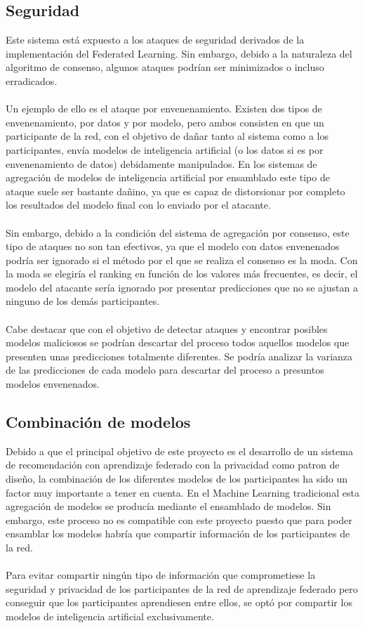 \subsection{Seguridad}
Este sistema está expuesto a los ataques de seguridad derivados de la implementación del Federated Learning. Sin embargo, debido a la naturaleza del algoritmo de consenso, algunos ataques podrían ser minimizados o incluso erradicados.
\\ \\
Un ejemplo de ello es el ataque por envenenamiento. Existen dos tipos de envenenamiento, por datos y por modelo, pero ambos consisten en que un participante de la red, con el objetivo de dañar tanto al sistema como a los participantes, envía modelos de inteligencia artificial (o los datos si es por envenenamiento de datos) debidamente manipulados. En los sistemas de agregación de modelos de inteligencia artificial por ensamblado este tipo de ataque suele ser bastante dañino, ya que es capaz de distorsionar por completo los resultados del modelo final con lo enviado por el atacante.
\\ \\
Sin embargo, debido a la condición del sistema de agregación por consenso, este tipo de ataques no son tan efectivos, ya que el modelo con datos envenenados podría ser ignorado si el método por el que se realiza el consenso es la moda. Con la moda se elegiría el ranking en función de los valores más frecuentes, es decir, el modelo del atacante sería ignorado por presentar predicciones que no se ajustan a ninguno de los demás participantes.
\\ \\
Cabe destacar que con el objetivo de detectar ataques y encontrar posibles modelos maliciosos se podrían descartar del proceso todos aquellos modelos que presenten unas predicciones totalmente diferentes. Se podría analizar la varianza de las predicciones de cada modelo para descartar del proceso a presuntos modelos envenenados.

\subsection{Combinación de modelos}
Debido a que el principal objetivo de este proyecto es el desarrollo de un sistema de recomendación con aprendizaje federado con la privacidad como patron de diseño, la combinación de los diferentes modelos de los participantes ha sido un factor muy importante a tener en cuenta. En el Machine Learning tradicional esta agregación de modelos se producía mediante el ensamblado de modelos. Sin embargo, este proceso no es compatible con este proyecto puesto que para poder ensamblar los modelos habría que compartir información de los participantes de la red.
\\ \\
Para evitar compartir ningún tipo de información que comprometiese la seguridad y privacidad de los participantes de la red de aprendizaje federado pero conseguir que los participantes aprendiesen entre ellos, se optó por compartir los modelos de inteligencia artificial exclusivamente.

